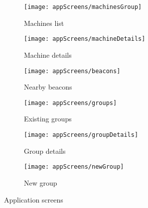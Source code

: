 \begin{figure}[H]
	\centering
	\begin{subfigure}[t]{0.3\textwidth}
		\centering	
		\texttt{[image: appScreens/machinesGroup]}
		\caption{Machines list}
		\label{subfig:machinesList}
	\end{subfigure}%
	\begin{subfigure}[t]{0.3\textwidth}
		\centering	
		\texttt{[image: appScreens/machineDetails]}
		\caption{Machine details}
		\label{subfig:machineDetails}
	\end{subfigure}
	\begin{subfigure}[t]{0.3\textwidth}
		\centering	
		\texttt{[image: appScreens/beacons]}
		\caption{Nearby beacons}
		\label{subfig:nearbyBeacons}
	\end{subfigure}
	\begin{subfigure}[t]{0.3\textwidth}
		\centering	
		\texttt{[image: appScreens/groups]}
		\caption{Existing groups}
		\label{subfig:existingGroups}
	\end{subfigure}
	\begin{subfigure}[t]{0.3\textwidth}
		\centering	
		\texttt{[image: appScreens/groupDetails]}
		\caption{Group details}
		\label{subfig:groupDetails}
	\end{subfigure}
	\begin{subfigure}[t]{0.3\textwidth}
		\centering	
		\texttt{[image: appScreens/newGroup]}
		\caption{New group}
		\label{subfig:newGroup}
	\end{subfigure}

	\caption{Application screens}
	\label{fig:appScreens}

\end{figure}

